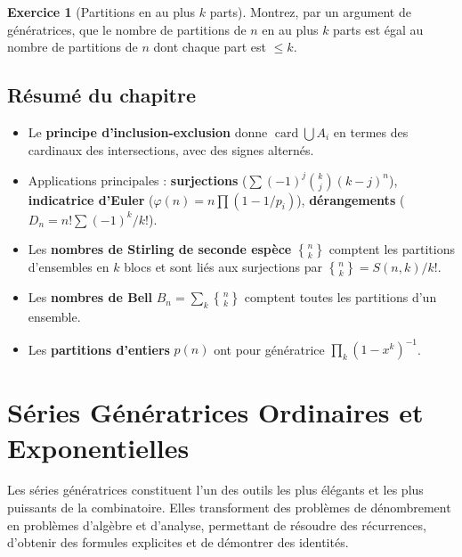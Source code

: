\documentclass[12pt,a4paper,openany]{book}
\theoremstyle{definition}
\newtheorem{exercice}{Exercice}[chapter]
\theoremstyle{plain}
\theoremstyle{remark}
\DeclareMathOperator{\card}{card}
\begin{document}
\begin{exercice}[Partitions en au plus $k$ parts]
\label{exo:partitions-k}
Montrez, par un argument de génératrices, que le nombre de partitions de $n$
en au plus $k$ parts est égal au nombre de partitions de $n$ dont chaque
part est $\leqslant k$.
\end{exercice}

\section*{Résumé du chapitre}

\begin{itemize}[nosep]
  \item Le \textbf{principe d'inclusion-exclusion} donne
    $\card{\bigcup A_i}$ en termes des cardinaux des intersections, avec
    des signes alternés.
  \item Applications principales : \textbf{surjections}
    ($\sum (-1)^j \binom{k}{j}(k-j)^n$), \textbf{indicatrice d'Euler}
    ($\varphi(n) = n\prod(1-1/p_i)$), \textbf{dérangements}
    ($D_n = n!\sum (-1)^k/k!$).
  \item Les \textbf{nombres de Stirling de seconde espèce}
    $\genfrac{\{}{\}}{0pt}{}{n}{k}$ comptent les partitions d'ensembles
    en $k$ blocs et sont liés aux surjections par
    $\genfrac{\{}{\}}{0pt}{}{n}{k} = S(n,k)/k!$.
  \item Les \textbf{nombres de Bell} $B_n = \sum_k \genfrac{\{}{\}}{0pt}{}{n}{k}$
    comptent toutes les partitions d'un ensemble.
  \item Les \textbf{partitions d'entiers} $p(n)$ ont pour génératrice
    $\prod_k (1-x^k)^{-1}$.
\end{itemize}


\chapter{Séries Génératrices Ordinaires et Exponentielles}
\label{ch:generatrices}

Les séries génératrices constituent l'un des outils les plus élégants et
les plus puissants de la combinatoire. Elles transforment des problèmes
de dénombrement en problèmes d'algèbre et d'analyse, permettant de résoudre
des récurrences, d'obtenir des formules explicites et de démontrer des identités.
\end{document}
